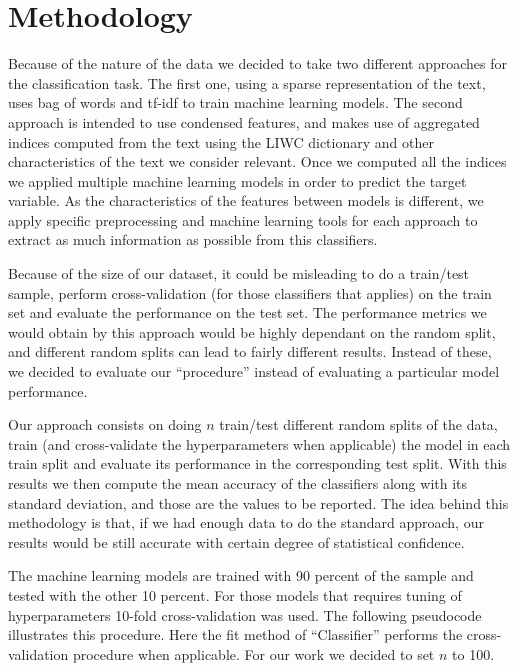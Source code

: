 \documentclass[12pt]{article}
\begin{document}
\section{Methodology}

Because of the nature of the data we decided to take two different approaches for the classification task. The first one, using a sparse representation of the text, uses bag of words and tf-idf to train machine learning models. The second approach is intended to use condensed features, and makes use of aggregated indices computed from the text using the LIWC dictionary and other characteristics of the text we consider relevant. Once we computed all the indices we applied multiple machine learning models in order to predict the target variable. As the characteristics of the features between models is different,  we apply specific preprocessing and machine learning tools for each approach to extract as much information as possible from this classifiers. 

Because of the size of our dataset, it could be misleading to do a train/test sample, perform cross-validation (for those classifiers that applies) on the train set and evaluate the performance on the test set. The performance metrics we would obtain by this approach would be highly dependant on the random split, and different random splits can lead to fairly different results. Instead of these, we decided to evaluate our ``procedure'' instead of evaluating a particular model performance. 

Our approach consists on doing $n$ train/test different random splits of the data, train (and cross-validate the hyperparameters when applicable) the model in each train split and evaluate its performance in the corresponding test split. With this results we then compute the mean accuracy of the classifiers along with its standard deviation, and those are the values to be reported. The idea behind this methodology is that, if we had enough data to do the standard approach, our results would be still accurate with certain degree of statistical confidence. 

The machine learning models are trained with 90 percent of the sample and tested with the other 10 percent. For those models that requires tuning of hyperparameters 10-fold cross-validation was used. The following pseudocode illustrates this procedure. Here the fit method of ``Classifier'' performs the cross-validation procedure when applicable. For our work we decided to set $n$ to 100.\\
\end{document}
